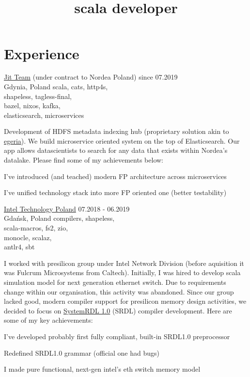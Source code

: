 \documentclass[a4paper,11pt]{cv4tw}%
\title{scala developer}
\begin{document}
\section{Experience}
      {\href{https://www.jit.team}{Jit Team} (under contract to Nordea Poland)}
      {since 07.2019\\Gdynia, Poland}
      {scala, cats, http4s,\\shapeless, tagless-final,
        \\bazel, nixos, kafka,\\elasticsearch, microservices}
	  {Development of HDFS metadata indexing hub (proprietary solution akin to \href{https://egeria.odpi.org}{egeria}). We build microservice oriented system on the top of Elasticsearch. Our app allows datascientists to search for any data that exists within Nordea's datalake. Please find some of my achievements below:
	    \begin{missions}
		\item I've introduced (and teached) modern FP architecture across microservices
		\item I've unified technology stack into more FP oriented one (better testability)
	    \end{missions}
      }
      {\href{https://www.intel.com/content/www/us/en/jobs/locations/poland.html}{Intel Technology Poland}}
      {07.2018 - 06.2019\\Gdańsk, Poland}
	  {compilers, shapeless,\\scala-macros, fs2, zio,\\monocle, scalaz,\\antlr4, sbt}
	  {I worked with presilicon group under Intel Network Division (before aquisition it was Fulcrum Microsystems from Caltech). Initially, I was hired to develop scala simulation model for next generation ethernet switch. Due to requirements change within our organisation, this activity was abandoned. Since our group lacked good, modern compiler support for presilicon memory design activities, we decided to focus on \href{https://www.accellera.org/downloads/standards/systemrdl}{SystemRDL 1.0} (SRDL) compiler development. Here are some of my key achievements:
	    \begin{missions}
        \item I've developed probably first fully compliant, built-in SRDL1.0 preprocessor
        \item Redefined SRDL1.0 grammar (official one had bugs)
   	    \item I made pure functional, next-gen intel's eth switch memory model
	    \end{missions}
      }
\end{document}
